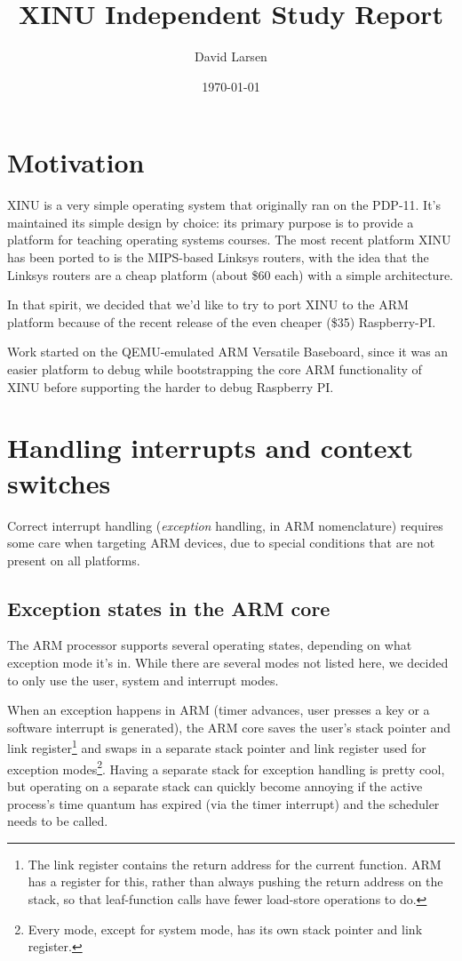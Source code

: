 \documentclass[12pt]{article}
\title{XINU Independent Study Report}
\author{David Larsen}
\date{\today}
\begin{document}
\maketitle

\tableofcontents

\section{Motivation}

XINU is a very simple operating system that originally ran on the PDP-11. It's
maintained its simple design by choice: its primary purpose is to provide a
platform for teaching operating systems courses. The most recent platform XINU
has been ported to is the MIPS-based Linksys routers, with the idea that the
Linksys routers are a cheap platform (about \$60 each) with a simple
architecture.

In that spirit, we decided that we'd like to try to port XINU to the ARM
platform because of the recent release of the even cheaper (\$35) Raspberry-PI.

Work started on the QEMU-emulated ARM Versatile Baseboard, since it was an
easier platform to debug while bootstrapping the core ARM functionality of XINU
before supporting the harder to debug Raspberry PI.

\section{Handling interrupts and context switches}

Correct interrupt handling ({\em exception} handling, in ARM nomenclature)
requires some care when targeting ARM devices, due to special conditions that
are not present on all platforms.

\subsection{Exception states in the ARM core}

The ARM processor supports several operating states, depending on what
exception mode it's in. While there are several modes not listed here, we
decided to only use the user, system and interrupt modes.

When an exception happens in ARM (timer advances, user presses a key or a
software interrupt is generated), the ARM core saves the user's stack pointer
and link register\footnote{The link register contains the return address for
the current function. ARM has a register for this, rather than always pushing
the return address on the stack, so that leaf-function calls have fewer
load-store operations to do.} and swaps in a separate stack pointer and link
register used for exception modes\footnote{Every mode, except for system mode,
has its own stack pointer and link register.}. Having a separate stack for
exception handling is pretty cool, but operating on a separate stack can
quickly become annoying if the active process's time quantum has expired (via
the timer interrupt) and the scheduler needs to be called.
\end{document}
